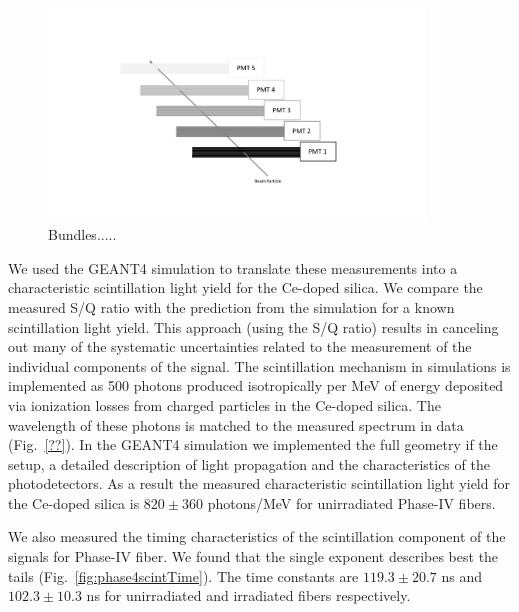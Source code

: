 \documentclass[a4paper,11pt]{article}
\begin{document}
\begin{figure}[ht]
\begin{center}\vspace{-1pc}
      \includegraphics[width=10cm]{Figures/FiberBundles.pdf}
\caption{\small Bundles.....}
    \label{fig:bundles}
\end{center}
\end{figure}

We used the GEANT4 simulation to translate these measurements into a characteristic scintillation light yield for the Ce-doped silica. We compare the measured S/Q ratio with the prediction from the simulation for a  known scintillation light yield. This approach (using the S/Q ratio) results in canceling out many of the systematic uncertainties related to the measurement of the individual components of the signal. The scintillation mechanism in simulations is implemented as 500 photons produced isotropically per MeV of energy deposited via ionization losses from charged particles in the Ce-doped silica. The wavelength of these photons is  matched to the measured spectrum in data (Fig.~\ref{??}). In the GEANT4 simulation we implemented the full geometry if the setup, a detailed description of light propagation and the characteristics of the photodetectors. 
As a result the measured characteristic scintillation light yield for the Ce-doped silica is $820\pm 360$ photons/MeV for unirradiated Phase-IV fibers. 

We also measured the timing characteristics of the scintillation component of the signals for Phase-IV fiber. We found that the single exponent describes best the tails (Fig.~\ref{fig:phase4scintTime}). The time constants are $119.3 \pm 20.7$ ns and $102.3 \pm 10.3$ ns for unirradiated and irradiated fibers respectively.
\end{document}
